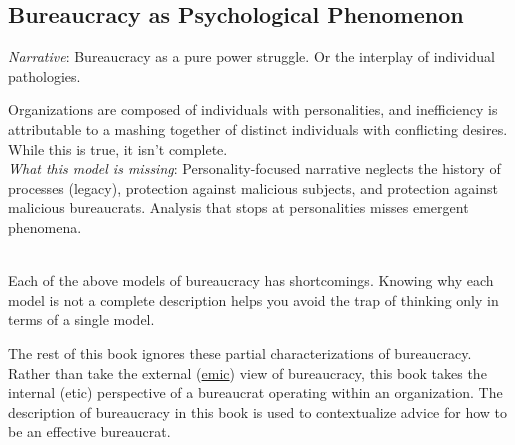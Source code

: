 \subsection*{Bureaucracy as Psychological Phenomenon}

\textit{Narrative}: Bureaucracy as a pure power struggle. Or the interplay of individual pathologies. 

Organizations are composed of individuals with personalities, and inefficiency is attributable to a mashing together of distinct individuals with conflicting desires.
While this is true, it isn't complete. \\
\textit{What this model is missing}: Personality-focused narrative neglects the history of processes (legacy), protection against malicious subjects, and protection against malicious bureaucrats. Analysis that stops at personalities misses emergent phenomena. %

\ \\

Each of the above models of bureaucracy has shortcomings. Knowing why each model is not a complete description helps you avoid the trap of thinking only in terms of a single model. 

The rest of this book ignores these partial characterizations of bureaucracy. 
Rather than take the external (\href{https://en.wikipedia.org/wiki/Emic_and_etic}{emic}) 
view of bureaucracy, this book takes the internal (etic) perspective of a bureaucrat operating within an organization. 
The description of bureaucracy in this book is used to contextualize advice for how to be an effective bureaucrat. 